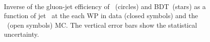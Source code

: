 \begin{figure}[htbp]
	\centering
	\quad
	\\
	\quad
	\caption[]{
		Inverse of the gluon-jet efficiency of \ntrk~(circles) and BDT~(stars) as a function of jet \pt~at the each WP in data (closed symbols) and the \pythia~(open symbols) MC. The vertical error bars show the statistical uncertainty.
		\label{fig:QG-pythia-Unc_Ntrk-wp}
	}
\end{figure}







